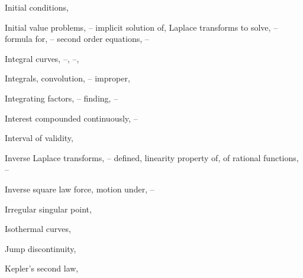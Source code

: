 \begin{theindex}
  \item Initial conditions, \pageref{eq:1.2.11}

  \item Initial value problems, \pageref{example:1.2.5}--\pageref{exer:1.2.1}
    \subitem implicit solution of, \pageref{thmtype:2.2.1}
    \subitem Laplace transforms to solve, \pageref{thmtype:8.3.1}--\pageref{exer:8.3.38}
      \subsubitem formula for, \pageref{example:8.6.2}--\pageref{eq:8.6.10}
      \subsubitem second order equations, \pageref{example:8.3.2}--\pageref{exer:8.3.38}

  \item Integral curves, \pageref{example:1.2.1}--\pageref{example:1.2.3}, \pageref{eq:8.3.1}--\pageref{exer:1.3.24},

  \item Integrals,
    \subitem convolution, \pageref{example:8.6.5}--\pageref{example:8.6.6}
    \subitem improper, \pageref{eq:8.1.1}

  \item Integrating factors, \pageref{eq:2.6.1}--\pageref{exer:2.6.30}
    \subitem finding, \pageref{eq:2.6.6}--\pageref{exer:2.6.30}

  \item Interest compounded continuously, \pageref{eq:4.1.7}--\pageref{example:4.1.4}

  \item Interval of validity, \pageref{example:1.2.6}

  \item Inverse Laplace transforms, \pageref{exer:8.1.18}--\pageref{exer:8.2.10}
    \subitem defined, \pageref{exer:8.1.18}
    \subitem linearity property of, \pageref{thmtype:8.2.1}
    \subitem of rational functions, \pageref{example:8.2.4}--\pageref{exer:8.2.10}

  \item Inverse square law force, motion under, \pageref{eq:6.4.10}--\pageref{exer:6.4.1}

  \item Irregular singular point, \pageref{thmtype:7.4.1}

  \item Isothermal curves, \pageref{eq:4.5.16} 

  \item Jump discontinuity, \pageref{eq:8.1.12} 

  \item Kepler's second law, \pageref{eq:6.4.1}


\end{theindex}
